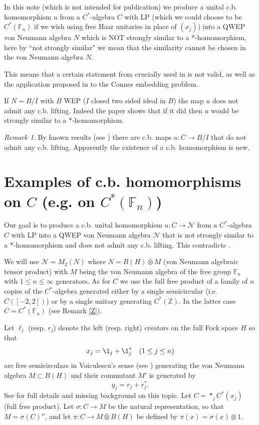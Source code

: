 \documentclass[11pt,leqno]{article}
\newcommand{\bb}[1]{\mathbb{#1}}
\newcommand{\cl}[1]{\mathcal{#1}}
\theoremstyle{plain}
\theoremstyle{definition}
\theoremstyle{remark}
\newtheorem{rem}[thm]{Remark}
\numberwithin{equation}{section}
\def\F{\bb F}
\def\Z{\bb Z}
\def\F{\bb F}
\begin{document}
       In this note (which is not intended for publication) we   produce 
      a unital c.b. homomorphism $u$ from a $C^*$-algebra $C$ with LP
      (which we could choose to be $C^*(\F_n)$ if we wish using free Haar unitaries in place of $(x_j)$)
      into a QWEP von Neumann algebra $N$
      which is NOT  strongly similar to a $*$-homomorphism,
      here by ``not strongly similar" we mean that the similarity cannot be chosen
      in the von Neumann algebra $N$.
      
      This means that a certain statement from \cite{[19]} crucially used in \cite{fang} 
      is not valid, as well as the application proposed in    \cite{fang}  to     the Connes embedding problem.
      
       If $N=B/I$ with $B$ WEP ($I$ closed two sided ideal in $B$)
      the map $u$ does not admit any c.b. lifting. 
      Indeed the paper  \cite{fang} shows that if it did then
      $u$ would be strongly similar to a $*$-homomorphism.
      
      \begin{rem} By known results (see \cite{oz}) there are 
      c.b. maps $u: C \to B/I$  that do not admit any c.b. lifting.
      Apparently the existence of a c.b. homomorphism is new.
      \end{rem}
      
      \section{Examples of c.b. homomorphisms on $C$  (e.g. on  $C^*(\F_n)$)}\label{s1}
      Our goal is to produce a c.b.  unital homomorphism
       $u: C \to {\cl N}$ 
       from a 
       $C^*$-algebra $C$ with LP into a QWEP von Neumann algebra ${\cl N}$
       that is not   strongly similar to a $*$-homomorphism and does not admit
       any c.b. lifting. This contradicts \cite[Lemma 2.3]{[19]}.

We will use $\cl N=M_2(N)$ where $N=B(H)\bar \otimes M$
(von Neumann algebraic tensor product)   with $M$ being the 
von Neumann algebra of the free group $\F_n$ with $1\le n\le \infty$ generators.
As for $C$ we use the full free product of a family  of $n$  copies of the $C^*$-algebra
generated either by a single semicircular  (i.e. $C([-2,2])$) or by a single 
unitary generating $C^*(\Z)$. In the latter case $C=C^*(\F_n)$  (see Remark \ref{Z}).

      Let $\ell_j$ (resp.  $r_j$)
      denote the left (resp. right) creators on the full Fock space $H$
      so that 
      $$x_j=\l_j+\l_j^* \quad (1\le j\le n)$$
      are free semicirculars in Voiculescu's sense (see \cite{VDN}) generating the  von Neumann algebra  $M\subset B(H)$
       and their commutant $M'$
       is generated
       by    $$y_j=r_j+r_j^*. $$
       See \cite{VDN} for full details and missing background on this topic.
       Let $C=\ast_j C^*(x_j)$ (full free product).
       Let $\sigma: C \to M$ be the natural representation, so that $M=\sigma(C)''$,
       and let $\pi: C \to M \bar \otimes B(H)$ be defined by $\pi(x)=\sigma(x)\otimes 1$.
       
\end{document}
